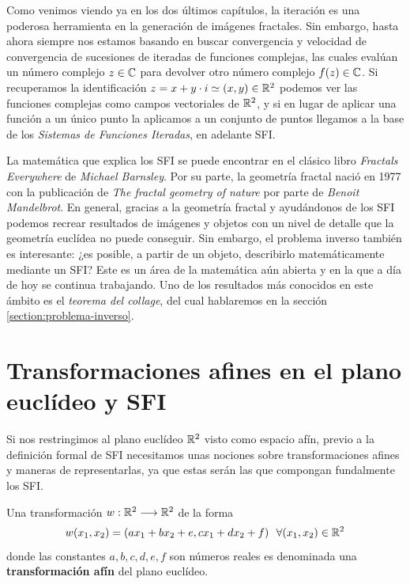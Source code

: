 
Como venimos viendo ya en los dos últimos capítulos, la iteración es una poderosa herramienta en la generación de imágenes fractales. Sin embargo, hasta ahora siempre nos estamos basando en buscar convergencia y velocidad de convergencia de sucesiones de iteradas de funciones complejas, las cuales evalúan un número complejo $z\in\mathbb{C}$ para devolver otro número complejo $f(z)\in\mathbb{C}$. Si recuperamos la identificación $z=x+y\cdot i\simeq (x,y)\in\mathbb{R}^2$ podemos ver las funciones complejas como campos vectoriales de $\mathbb{R}^2$, y si en lugar de aplicar una función a un único punto la aplicamos a un conjunto de puntos llegamos a la base de los \textit{Sistemas de Funciones Iteradas}, en adelante SFI. 

La matemática que explica los SFI se puede encontrar en el clásico libro \textit{Fractals Everywhere} \cite{Barnsley} de \textit{Michael Barnsley}. Por su parte, la geometría fractal nació en 1977 con la publicación de \textit{The fractal geometry of nature} \cite{Mandelbrot} por parte de \textit{Benoit Mandelbrot}. En general, gracias a la geometría fractal y ayudándonos de los SFI podemos recrear resultados de imágenes y objetos con un nivel de detalle que la geometría euclídea no puede conseguir. Sin embargo, el problema inverso también es interesante: ¿es posible, a partir de un objeto, describirlo matemáticamente mediante un SFI? Este es un área de la matemática aún abierta y en la que a día de hoy se continua trabajando. Uno de los resultados más conocidos en este ámbito es el \textit{teorema del collage}, del cual hablaremos en la sección \ref{section:problema-inverso}.

\section{Transformaciones afines en el plano euclídeo y SFI}

Si nos restringimos al plano euclídeo $\mathbb{R}^2$ visto como espacio afín, previo a la definición formal de SFI necesitamos unas nociones sobre transformaciones afines y maneras de representarlas, ya que estas serán las que compongan fundalmente los SFI.

\begin{definicion}
    Una transformación $w:\mathbb{R}^2\longrightarrow\mathbb{R}^2$ de la forma
    \begin{equation}
        w(x_1,x_2)=(ax_1+bx_2+e,cx_1+dx_2+f) \ \ \forall (x_1,x_2)\in\mathbb{R}^2
    \end{equation}
    donde las constantes $a,b,c,d,e,f$ son números reales es denominada una \textbf{transformación afín} del plano euclídeo.
\end{definicion}

